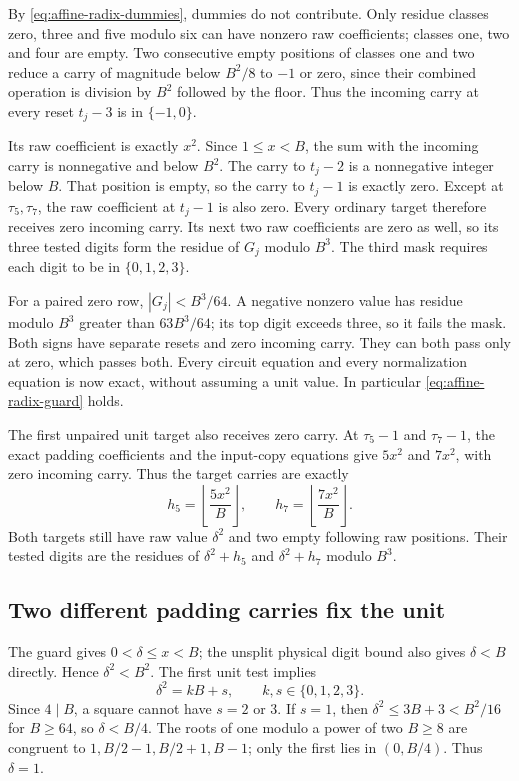 By \eqref{eq:affine-radix-dummies}, dummies do not contribute.
Only residue classes zero, three and five modulo six can have
nonzero raw coefficients; classes one, two and four are empty.
Two consecutive empty positions of classes one and two reduce
a carry of magnitude below $B^2/8$ to $-1$ or zero, since their
combined operation is division by $B^2$ followed by the floor.
Thus the incoming carry at every reset $t_j-3$ is in
$\{-1,0\}$.

Its raw coefficient is exactly $x^2$. Since $1\le x<B$, the
sum with the incoming carry is nonnegative and below $B^2$.
The carry to $t_j-2$ is a nonnegative integer below $B$.
That position is empty, so the carry to $t_j-1$ is exactly zero.
Except at $\tau_5,\tau_7$, the raw coefficient at $t_j-1$
is also zero. Every ordinary target therefore receives zero
incoming carry. Its next two raw coefficients are zero as well,
so its three tested digits form the residue of $G_j$ modulo
$B^3$. The third mask requires each digit to be in
$\{0,1,2,3\}$.

For a paired zero row, $|G_j|<B^3/64$. A negative nonzero
value has residue modulo $B^3$ greater than $63B^3/64$;
its top digit exceeds three, so it fails the mask. Both signs
have separate resets and zero incoming carry. They can both
pass only at zero, which passes both. Every circuit equation
and every normalization equation is now exact, without assuming
a unit value. In particular \eqref{eq:affine-radix-guard} holds.

The first unpaired unit target also receives zero carry. At
$\tau_5-1$ and $\tau_7-1$, the exact padding coefficients
and the input-copy equations give $5x^2$ and $7x^2$, with
zero incoming carry. Thus the target carries are exactly
\begin{equation}\label{eq:affine-radix-two-carries}
 h_5=\left\lfloor\frac{5x^2}{B}\right\rfloor,
 \qquad h_7=\left\lfloor\frac{7x^2}{B}\right\rfloor.
\end{equation}
Both targets still have raw value $\delta^2$ and two empty
following raw positions. Their tested digits are the residues
of $\delta^2+h_5$ and $\delta^2+h_7$ modulo $B^3$.

\subsection{Two different padding carries fix the unit}

The guard gives $0<\delta\le x<B$; the unsplit physical
digit bound also gives $\delta<B$ directly. Hence
$\delta^2<B^2$. The first unit test implies
\begin{equation}\label{eq:affine-radix-unit-digits}
 \delta^2=kB+s,\qquad k,s\in\{0,1,2,3\}.
\end{equation}
Since $4\mid B$, a square cannot have $s=2$ or $3$. If $s=1$,
then $\delta^2\le3B+3<B^2/16$ for $B\ge64$, so
$\delta<B/4$. The roots of one modulo a power of two $B\ge8$
are congruent to $1,B/2-1,B/2+1,B-1$; only the first lies in
$(0,B/4)$. Thus $\delta=1$.

